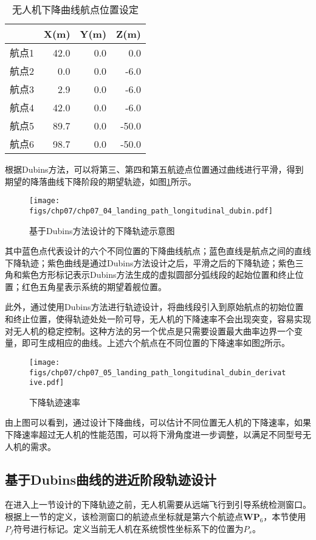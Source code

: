 \begin{table}[ht]
	\centering
	\caption{无人机下降曲线航点位置设定}
	\label{lab:uav_landing_six_points}
	\begin{tabular}{crrr}
		\hline
		& \multicolumn{1}{c}{X(m)} & \multicolumn{1}{c}{Y(m)} & \multicolumn{1}{c}{Z(m)} \\ \hline
		航点1 & 42.0 & 0.0 & 0.0 \\
		航点2 & 0.0 & 0.0 & -6.0 \\
		航点3 & 2.9 & 0.0 & -6.0 \\
		航点4 & 42.0 & 0.0 & -6.0 \\
		航点5 & 89.7 & 0.0 & -50.0 \\
		航点6 & 98.7 & 0.0 & -50.0 \\ \hline
	\end{tabular}
\end{table}
根据Dubins方法，可以将第三、第四和第五航迹点位置通过曲线进行平滑，得到期望的降落曲线下降阶段的期望轨迹，如图\ref{fig:chp07_04_landing_path_longitudinal_dubin}所示。
\begin{figure}[ht]   
	\centering
	\texttt{[image: figs/chp07/chp07\_04\_landing\_path\_longitudinal\_dubin.pdf]}
	\caption{基于Dubins方法设计的下降轨迹示意图}
	\label{fig:chp07_04_landing_path_longitudinal_dubin}
\end{figure}
其中蓝色点代表设计的六个不同位置的下降曲线航点；蓝色直线是航点之间的直线下降轨迹；紫色曲线是通过Dubins方法设计之后，平滑之后的下降轨迹；紫色三角和紫色方形标记表示Dubins方法生成的虚拟圆部分弧线段的起始位置和终止位置；红色五角星表示系统的期望着舰位置。


此外，通过使用Dubins方法进行轨迹设计，将曲线段引入到原始航点的初始位置和终止位置，使得轨迹处处一阶可导，无人机的下降速率不会出现突变，容易实现对无人机的稳定控制。这种方法的另一个优点是只需要设置最大曲率边界一个变量，即可生成相应的曲线。上述六个航点在不同位置的下降速率如图\ref{fig:chp07_05_landing_path_longitudinal_dubin_derivative}所示。
\begin{figure}[ht]   
	\centering
	\texttt{[image: figs/chp07/chp07\_05\_landing\_path\_longitudinal\_dubin\_derivative.pdf]}
	\caption{下降轨迹速率}
	\label{fig:chp07_05_landing_path_longitudinal_dubin_derivative}
\end{figure}
由上图可以看到，通过设计下降曲线，可以估计不同位置无人机的下降速率，如果下降速率超过无人机的性能范围，可以将下滑角度进一步调整，以满足不同型号无人机的需求。

\subsection{基于Dubins曲线的进近阶段轨迹设计}
在进入上一节设计的下降轨迹之前，无人机需要从远端飞行到引导系统检测窗口。根据上一节的定义，该检测窗口的航迹点坐标就是第六个航迹点$\mathbf{WP}_6$，本节使用$P_f$符号进行标记。定义当前无人机在系统惯性坐标系下的位置为$P_s$。


